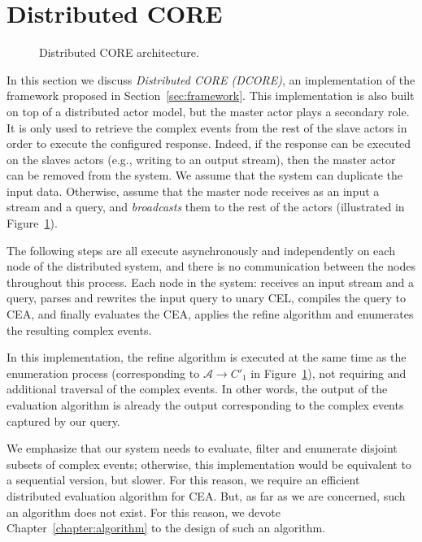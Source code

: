 
\section{Distributed CORE}\label{sec:dcore}

\begin{figure}[H]
  \centering
  \caption{Distributed CORE architecture.}
  \label{fig:dcore}
\end{figure}

In this section we discuss \emph{Distributed CORE (DCORE)}, an implementation of the framework proposed in Section~\ref{sec:framework}. This implementation is also built on top of a distributed actor model, but the master actor plays a secondary role. It is only used to retrieve the complex events from the rest of the slave actors in order to execute the configured response. Indeed, if the response can be executed on the slaves actors (e.g., writing to an output stream), then the master actor can be removed from the system. We assume that the system can duplicate the input data. Otherwise, assume that the master node receives as an input a stream and a query, and \emph{broadcasts} them to the rest of the actors (illustrated in Figure~\ref{fig:dcore}).

The following steps are all execute asynchronously and independently on each node of the distributed system, and there is no communication between the nodes throughout this process. Each node in the system: receives an input stream and a query, parses and rewrites the input query to unary CEL, compiles the query to CEA, and finally evaluates the CEA, applies the refine algorithm and enumerates the resulting complex events.

In this implementation, the refine algorithm is executed at the same time as the enumeration process (corresponding to $\mathcal{A} \to C'_{1}$ in Figure~\ref{fig:dcore}), not requiring and additional traversal of the complex events. In other words, the output of the evaluation algorithm is already the output corresponding to the complex events captured by our query.

We emphasize that our system needs to evaluate, filter and enumerate disjoint subsets of complex events; otherwise, this implementation would be equivalent to a sequential version, but slower. For this reason, we require an efficient distributed evaluation algorithm for CEA. But, as far as we are concerned, such an algorithm does not exist. For this reason, we devote Chapter~\ref{chapter:algorithm} to the design of such an algorithm.


